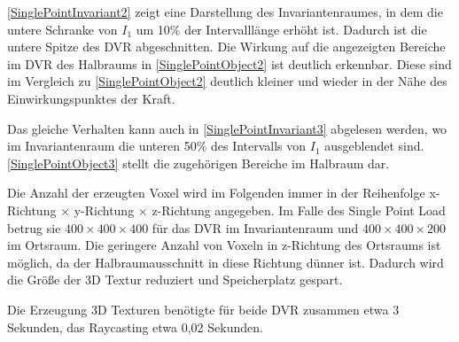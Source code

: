 \documentclass[a4paper,fontsize=12pt,toc=bib,parskip=half,ngerman]{scrartcl}
\begin{document}
\cref{SinglePointInvariant2} zeigt eine Darstellung des Invariantenraumes, in dem die untere Schranke von $I_1$ um 10\% der Intervalll\"ange erh\"oht ist. Dadurch ist die untere Spitze des DVR abgeschnitten. Die Wirkung auf die angezeigten Bereiche im DVR des Halbraums in \cref{SinglePointObject2} ist deutlich erkennbar. Diese sind im Vergleich zu \cref{SinglePointObject2} deutlich kleiner und wieder in der N\"ahe des Einwirkungspunktes der Kraft. 

Das gleiche Verhalten kann auch in \cref{SinglePointInvariant3} abgelesen werden, wo im Invariantenraum die unteren 50\% des Intervalls von $I_1$ ausgeblendet sind. \cref{SinglePointObject3} stellt die zugeh\"origen Bereiche im Halbraum dar.

Die Anzahl der erzeugten Voxel wird im Folgenden immer in der Reihenfolge x-Richtung $\times$ y-Richtung $\times$ z-Richtung angegeben.
Im Falle des Single Point Load betrug sie $400\times400\times400$ f\"ur das DVR im Invariantenraum und $400\times400\times200$ im Ortsraum. Die geringere Anzahl von Voxeln in z-Richtung des Ortsraums ist m\"oglich, da der Halbraumausschnitt in diese Richtung d\"unner ist. Dadurch wird die Gr\"o{\ss}e der 3D Textur reduziert und Speicherplatz gespart.

Die Erzeugung 3D Texturen ben\"otigte f\"ur beide DVR zusammen etwa 3 Sekunden, das Raycasting etwa 0,02 Sekunden.
\end{document}
